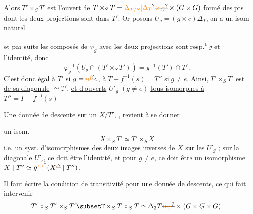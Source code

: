 
Alors $T'\times_S T'$ est l'ouvert de $T\times_S T=\unsure{\Delta_{T/S}|\Delta_T}\deleted{\unsure{\times_G}}\times(G\times G)$ formé des pts dont les deux projections sont dans $T'$. Or posons $U_g=(g\times e)\Delta_T$,  on a un isom naturel
 

et par suite les composés de $\varphi_g$ avec les deux projections sont resp.\textsuperscript{t} $g$ et l'identité, donc
\[
\varphi_g^{-1}(U_g\cap(T'\times_S T'))=g^{-1}(T')\cap T'.
\]
C'est donc égal à $T'$ si $g=\deleted{\unsure{id}}e$, à $T-f^{-1}(s)=T''$ si $g\ne e$. \uline{Ainsi}, $T'\times_S T'$ \uline{est}    \uline{de sa diagonale} $\simeq T'$, \uline{et d'ouverts} $U'_g$ $(g\ne e)$ \uline{tous isomorphes à} $T''=T-f^{-1}(s)$

Une donnée de descente sur un $X/T'$, , revient  à se donner
\textsc{}\\
 


un isom.
\[
X\times_S T'\simeq T'\times_S X
\]
i.e. un syst. d'isomorphismes des deux images inverses de $X$ sur les $U'_g$ ; sur la diagonale $U'_e$, ce doit être l'identité, et pour $g\ne e$, ce doit être un isomorphisme $X\mid T''\simeq g^{\unsure{\star|*}}(X\deleted{\unsure{'}}\mid T'')$.

Il faut écrire la condition de transitivité pour une donnée de descente, ce qui fait intervenir
\[
T'\times_S T'\times_S T'\subsetT\times_S T\times_S T\simeq\Delta_3T\deleted{\unsure{\times_G}}\times(G\times G\times G).
\]

